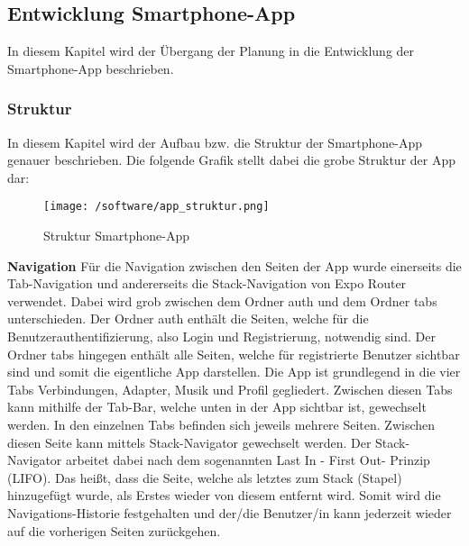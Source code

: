 \documentclass[11pt, twoside]{article}
\begin{document}
\subsection{Entwicklung Smartphone-App}
In diesem Kapitel wird der Übergang der Planung in die Entwicklung der Smartphone-App beschrieben.
\subsubsection{Struktur}
In diesem Kapitel wird der Aufbau bzw. die Struktur der Smartphone-App genauer beschrieben. Die folgende Grafik stellt dabei die grobe Struktur der App dar:
\begin{figure}
	\texttt{[image: /software/app\_struktur.png]}
\caption{Struktur Smartphone-App}
\end{figure}
\FloatBarrier
\textbf{Navigation} \newline
Für die Navigation zwischen den Seiten der App wurde einerseits die Tab-Navigation und andererseits die Stack-Navigation von \glqq Expo Router\grqq{} verwendet. Dabei wird grob zwischen dem Ordner \glqq auth\grqq{} und dem Ordner \glqq tabs\grqq{} unterschieden. Der Ordner \glqq auth\grqq{} enthält die Seiten, welche für die Benutzerauthentifizierung, also Login und Registrierung, notwendig sind. Der Ordner \glqq tabs\grqq{} hingegen enthält alle Seiten, welche für registrierte Benutzer sichtbar sind und somit die eigentliche App darstellen. Die App ist grundlegend in die vier Tabs \glqq Verbindungen\grqq{}, \glqq Adapter\grqq{}, \glqq Musik\grqq{} und \glqq Profil\grqq{}  gegliedert. Zwischen diesen Tabs kann mithilfe der Tab-Bar, welche unten in der App sichtbar ist, gewechselt werden. In den einzelnen Tabs befinden sich jeweils mehrere Seiten. Zwischen diesen Seite kann mittels Stack-Navigator gewechselt werden. Der Stack-Navigator arbeitet dabei nach dem sogenannten \glqq Last In - First Out\grqq{}- Prinzip (LIFO). Das heißt, dass die Seite, welche als letztes zum Stack (Stapel) hinzugefügt wurde, als Erstes wieder von diesem entfernt wird. Somit wird die Navigations-Historie festgehalten und der/die Benutzer/in kann jederzeit wieder auf die vorherigen Seiten zurückgehen. \parencite[vgl.][]{noauthor_urlpi28_nodate}
\end{document}
